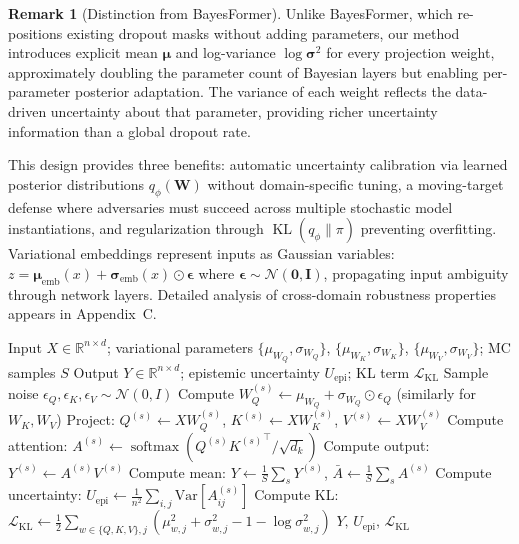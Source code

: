 \documentclass[12pt,a4paper]{article}
\theoremstyle{definition}
\newtheorem{remark}[theorem]{Remark}
\DeclareMathOperator{\KL}{KL}
\DeclareMathOperator{\softmax}{softmax}
\begin{document}
\begin{remark}[Distinction from BayesFormer]
Unlike BayesFormer, which re-positions existing dropout masks without adding parameters, our method introduces explicit mean $\bm{\mu}$ and log-variance $\log\bm{\sigma}^2$ for every projection weight, approximately doubling the parameter count of Bayesian layers but enabling per-parameter posterior adaptation. The variance of each weight reflects the data-driven uncertainty about that parameter, providing richer uncertainty information than a global dropout rate.
\end{remark}

This design provides three benefits: automatic uncertainty calibration via learned posterior distributions $q_\phi(\bm{W})$ without domain-specific tuning, a moving-target defense where adversaries must succeed across multiple stochastic model instantiations, and regularization through $\KL(q_\phi\|\pi)$ preventing overfitting. Variational embeddings represent inputs as Gaussian variables: $z=\bm{\mu}_{\text{emb}}(x)+\bm{\sigma}_{\text{emb}}(x)\odot\bm{\epsilon}$ where $\bm{\epsilon}\sim\mathcal{N}(\bm{0},\bm{I})$, propagating input ambiguity through network layers. Detailed analysis of cross-domain robustness properties appears in Appendix~C.

\begin{algorithm}[t]
\caption{Bayesian Attention with Uncertainty Propagation}
\label{alg:bayesian_attention}
\begin{algorithmic}[1]
\Require Input $X\in\mathbb{R}^{n\times d}$; variational parameters $\{\mu_{W_Q},\sigma_{W_Q}\}$, $\{\mu_{W_K},\sigma_{W_K}\}$, $\{\mu_{W_V},\sigma_{W_V}\}$; MC samples $S$
\Ensure Output $Y\in\mathbb{R}^{n\times d}$; epistemic uncertainty $U_{\text{epi}}$; KL term $\mathcal{L}_{\mathrm{KL}}$
  \State Sample noise $\epsilon_Q,\epsilon_K,\epsilon_V\sim\mathcal{N}(0,I)$
  \State Compute $W_Q^{(s)}\gets \mu_{W_Q}+\sigma_{W_Q}\odot\epsilon_Q$ (similarly for $W_K, W_V$)
  \State Project: $Q^{(s)}\gets XW_Q^{(s)}$, $K^{(s)}\gets XW_K^{(s)}$, $V^{(s)}\gets XW_V^{(s)}$
  \State Compute attention: $A^{(s)}\gets \softmax(Q^{(s)}{K^{(s)}}^\top/\sqrt{d_k})$
  \State Compute output: $Y^{(s)}\gets A^{(s)}V^{(s)}$
\EndFor
\State Compute mean: $Y\gets \frac{1}{S}\sum_s Y^{(s)}$, $\bar{A}\gets \frac{1}{S}\sum_s A^{(s)}$
\State Compute uncertainty: $U_{\text{epi}}\gets \frac{1}{n^2}\sum_{i,j}\text{Var}[A^{(s)}_{ij}]$
\State Compute KL: $\mathcal{L}_{\mathrm{KL}}\gets \tfrac{1}{2}\sum_{w\in\{Q,K,V\},j} (\mu_{w,j}^2+\sigma_{w,j}^2-1-\log\sigma_{w,j}^2)$
\State \Return $Y,\,U_{\text{epi}},\,\mathcal{L}_{\mathrm{KL}}$
\end{algorithmic}
\end{algorithm}
\end{document}
